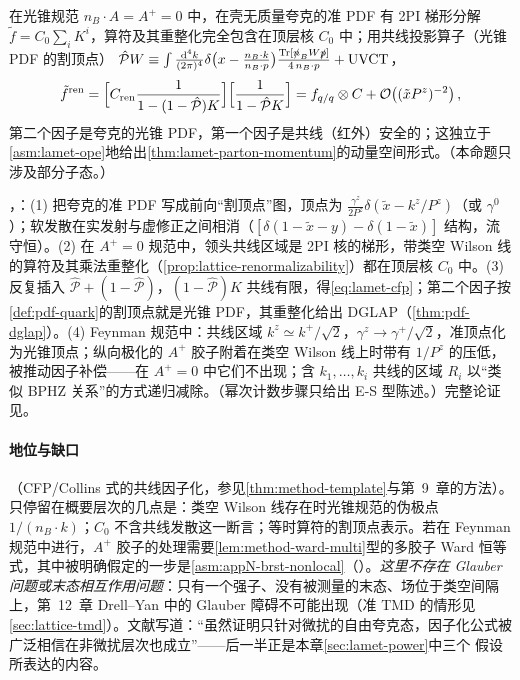 \begin{proposition}\label{prop:lamet-cfp}
在光锥规范 $n_B\cdot A=A^+=0$ 中，在壳无质量夸克的准 PDF 有 2PI 梯形分解 $\tilde f=C_0\sum_iK^i$，算符及其重整化完全包含在顶层核 $C_0$ 中；用共线投影算子（光锥 PDF 的割顶点）
$\hat{\mathcal P}W\equiv\int\frac{\mathrm{d}^4k}{(2\pi)^4}\delta\big(x-\frac{n_B\cdot k}{n_B\cdot p}\big)\frac{\operatorname{Tr}[\slashed{n}_BW\slashed{p}]}{4\,n_B\cdot p}+\text{UVCT}$，
\begin{equation}\label{eq:lamet-cfp}
\tilde f^{\rm ren}=\Big[C_{\rm ren}\frac1{1-(1-\hat{\mathcal P})K}\Big]\Big[\frac1{1-\hat{\mathcal P}K}\Big]=f_{q/q}\otimes C+\mathcal{O}\!\left((\tilde xP^z)^{-2}\right),
\end{equation}
第二个因子是夸克的光锥 PDF，第一个因子是共线（红外）安全的；这独立于\cref{asm:lamet-ope}地给出\cref{thm:lamet-parton-momentum}的动量空间形式。（本命题只涉及部分子态。）
\end{proposition}

\begin{proofsketch}
\cite{Ma:2014jla}，\cite[第~III.B~节]{JiEtAl2021}：(1) 把夸克的准 PDF 写成前向“割顶点”图，顶点为 $\frac{\gamma^z}{2P^z}\delta(\tilde x-k^z/P^z)$（或 $\gamma^0$）；软发散在实发射与虚修正之间相消（$[\delta(1-\tilde x-y)-\delta(1-\tilde x)]$ 结构，流守恒）。(2) 在 $A^+=0$ 规范中，领头共线区域是 2PI 核的梯形\cite{EllisEtAl1979,CurciFurmanskiPetronzio1980}，带类空 Wilson 线的算符及其乘法重整化（\cref{prop:lattice-renormalizability}）都在顶层核 $C_0$ 中。(3) 反复插入 $\hat{\mathcal P}+(1-\hat{\mathcal P})$，$(1-\hat{\mathcal P})K$ 共线有限，得\cref{eq:lamet-cfp}；第二个因子按\cref{def:pdf-quark}的割顶点就是光锥 PDF，其重整化给出 DGLAP（\cref{thm:pdf-dglap}）。(4) Feynman 规范中：共线区域 $k^z\simeq k^+/\sqrt2$，$\gamma^z\to\gamma^+/\sqrt2$，准顶点化为光锥顶点；纵向极化的 $A^+$ 胶子附着在类空 Wilson 线上时带有 $1/P^z$ 的压低，被推动因子补偿——在 $A^+=0$ 中它们不出现；含 $k_1,\dots,k_i$ 共线的区域 $R_i$ 以“类似 BPHZ 关系”的方式递归减除\cite[第~III.B~节]{JiEtAl2021}。（幂次计数步骤只给出 E-S 型陈述。）完整论证见\cite{Ma:2014jla}。
\end{proofsketch}

\paragraph{地位与缺口}
\tagA（CFP/Collins 式的共线因子化，参见\cref{thm:method-template}与第~9~章的方法）。只停留在概要层次的几点是：类空 Wilson 线存在时光锥规范的伪极点 $1/(n_B\cdot k)$；$C_0$ 不含共线发散这一断言；等时算符的割顶点表示。若在 Feynman 规范中进行，$A^+$ 胶子的处理需要\cref{lem:method-ward-multi}型的多胶子 Ward 恒等式，其中被明确假定的一步是\cref{asm:appN-brst-nonlocal}（\tagC）。\emph{这里不存在 Glauber 问题或末态相互作用问题}：只有一个强子、没有被测量的末态、场位于类空间隔上，第~12~章 Drell--Yan 中的 Glauber 障碍不可能出现（准 TMD 的情形见\cref{sec:lattice-tmd}）。文献\cite{JiEtAl2021}写道：“虽然证明只针对微扰的自由夸克态，因子化公式被广泛相信在非微扰层次也成立”——后一半正是本章\cref{sec:lamet-power}中三个 \tagC 假设所表达的内容。

